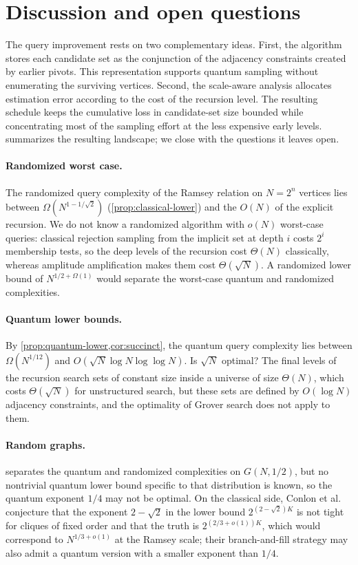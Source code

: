\section{Discussion and open questions}
\label{sec:scope}

The query improvement rests on two complementary ideas.  First, the algorithm
stores each candidate set as the conjunction of the adjacency constraints
created by earlier pivots.  This representation supports quantum sampling
without enumerating the surviving vertices.  Second, the scale-aware analysis
allocates estimation error according to the cost of the recursion level.  The
resulting schedule keeps the cumulative loss in candidate-set size bounded
while concentrating most of the sampling effort at the less expensive early
levels.   summarizes the resulting landscape; we close with
the questions it leaves open.

\paragraph{Randomized worst case.}
The randomized query complexity of the Ramsey relation on $N=2^n$ vertices
lies between $\Omega(N^{1-1/\sqrt2})$ (\cref{prop:classical-lower}) and the
$O(N)$ of the explicit recursion.  We do not know a randomized algorithm
with $o(N)$ worst-case queries: classical rejection sampling from the
implicit set at depth $i$ costs $2^i$ membership tests, so the deep levels
of the recursion cost $\Theta(N)$ classically, whereas amplitude
amplification makes them cost $\Theta(\sqrt N)$.  A randomized lower bound
of $N^{1/2+\Omega(1)}$ would separate the worst-case quantum and randomized
complexities.

\paragraph{Quantum lower bounds.}
By \cref{prop:quantum-lower,cor:succinct}, the quantum query complexity
lies between $\Omega(N^{1/12})$ and $O(\sqrt N\log N\log\log N)$.  Is
$\sqrt N$ optimal?  The final levels of the recursion search sets of
constant size inside a universe of size $\Theta(N)$, which costs
$\Theta(\sqrt N)$ for unstructured search, but these sets are defined by
$O(\log N)$ adjacency constraints, and the optimality of Grover search does
not apply to them.

\paragraph{Random graphs.}
 separates the quantum and randomized complexities on
$G(N,1/2)$, but no nontrivial quantum lower bound specific to that
distribution is known, so the quantum exponent $1/4$ may not be optimal.  On the classical side, Conlon et
al.\ \cite{ConlonFoxGrinshpunHe2019} conjecture that the exponent
$2-\sqrt2$ in the lower bound $2^{(2-\sqrt2)K}$ is not tight for cliques of
fixed order and that the truth is $2^{(2/3+o(1))K}$, which would correspond
to $N^{1/3+o(1)}$ at the Ramsey scale; their branch-and-fill strategy may
also admit a quantum version with a smaller exponent than $1/4$.


